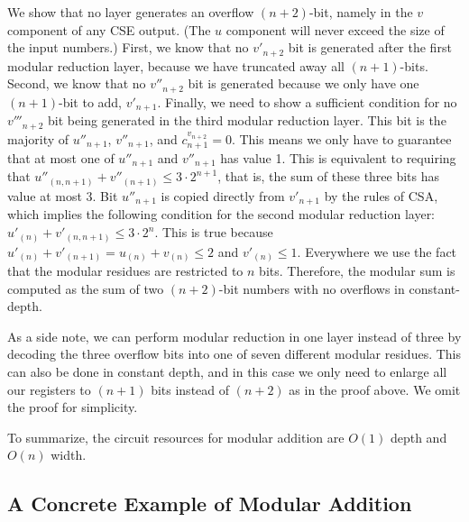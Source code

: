 \documentclass[twoside]{article}
\begin{document}
We show that no layer generates an overflow $(n+2)$-bit, namely in the
$v$ component of any CSE output. (The $u$ component will never exceed the
size of the input numbers.) First, we know that no $v'_{n+2}$ bit
is generated after the first modular reduction layer, because we have
truncated away all $(n+1)$-bits. Second, we know that no $v''_{n+2}$ bit is
generated because we only have one $(n+1)$-bit to add, $v'_{n+1}$.
Finally, we need to show a sufficient condition for no $v'''_{n+2}$ bit being
generated in the third modular reduction layer. This bit is the majority of
$u''_{n+1}$, $v''_{n+1}$, and $c^{v_{n+2}}_{n+1} = 0$. This means we only have
to guarantee that at most one of $u''_{n+1}$ and $v''_{n+1}$ has value 1.
This is equivalent to requiring that
$u''_{(n,n+1)} + v''_{(n+1)} \le 3\cdot 2^{n+1}$, that is, the sum of these
three bits has value at most $3$. Bit $u''_{n+1}$ is copied directly from
$v'_{n+1}$ by the rules of CSA, which implies the following condition for
the second modular reduction layer:
$u'_{(n)} + v'_{(n,n+1)} \le 3\cdot 2^n$. This is true because
$u'_{(n)} + v'_{(n+1)} = u_{(n)} + v_{(n)} \le 2$ and $v'_{(n)} \le 1$.
Everywhere
we use the fact that the modular residues are restricted to $n$ bits.
Therefore, the modular sum is computed as the sum of two $(n+2)$-bit numbers
with no overflows in constant-depth.
\square\,

As a side note, we can perform modular reduction in one layer instead of
three by decoding the three overflow bits into one of seven different
modular residues. This can also be done in constant depth, and in this case
we only need to enlarge all our registers to $(n+1)$ bits instead of $(n+2)$
as in the proof above. We omit the proof for simplicity.

To summarize,
the circuit resources for modular addition are $O(1)$ depth and $O(n)$ width.

\subsection{A Concrete Example of Modular Addition}
\label{subsec:concrete}
\end{document}
